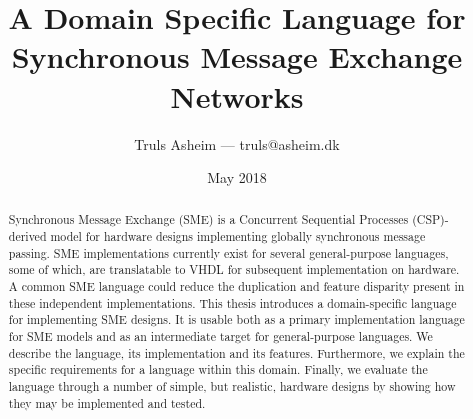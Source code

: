 \documentclass[oneside,a4paper,oldfontcommands]{memoir}
\author{Truls Asheim --- {\ttfamily truls@asheim.dk}}
\title{A Domain Specific Language for Synchronous Message Exchange Networks}
\date{May 2018}
\begin{document}
\frontmatter

\begin{titlingpage}
\maketitle
\end{titlingpage}

\newpage
\begin{abstract}
  Synchronous Message Exchange (SME) is a Concurrent Sequential Processes
  (CSP)-derived model for hardware designs implementing globally synchronous
  message passing. SME implementations currently exist for several
  general-purpose languages, some of which, are translatable to VHDL for
  subsequent implementation on hardware. A common SME language could reduce the
  duplication and feature disparity present in these independent
  implementations. This thesis introduces a domain-specific language for
  implementing SME designs. It is usable both as a primary implementation
  language for SME models and as an intermediate target for general-purpose
  languages. We describe the language, its implementation and its
  features. Furthermore, we explain the specific requirements for a language
  within this domain. Finally, we evaluate the language through a number of
  simple, but realistic, hardware designs by showing how they may be implemented
  and tested.
\end{abstract}
\newpage


\newpage
\tableofcontents

\printglossary[type=\acronymtype,title=Abbrevations]


\end{document}
